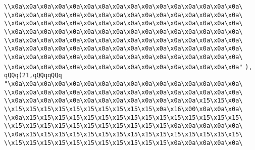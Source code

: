 \verb|\\x0a\x0a\x0a\x0a\x0a\x0a\x0a\x0a\x0a\x0a\x0a\x0a\x0a\x0a\x0a\x0a\|\newline
\verb|\\x0a\x0a\x0a\x0a\x0a\x0a\x0a\x0a\x0a\x0a\x0a\x0a\x0a\x0a\x0a\x0a\|\newline
\verb|\\x0a\x0a\x0a\x0a\x0a\x0a\x0a\x0a\x0a\x0a\x0a\x0a\x0a\x0a\x0a\x0a\|\newline
\verb|\\x0a\x0a\x0a\x0a\x0a\x0a\x0a\x0a\x0a\x0a\x0a\x0a\x0a\x0a\x0a\x0a\|\newline
\verb|\\x0a\x0a\x0a\x0a\x0a\x0a\x0a\x0a\x0a\x0a\x0a\x0a\x0a\x0a\x0a\x0a\|\newline
\verb|\\x0a\x0a\x0a\x0a\x0a\x0a\x0a\x0a\x0a\x0a\x0a\x0a\x0a\x0a\x0a\x0a\|\newline
\verb|\\x0a\x0a\x0a\x0a\x0a\x0a\x0a\x0a\x0a\x0a\x0a\x0a\x0a\x0a\x0a\x0a\|\newline
\verb|\\x0a\x0a\x0a\x0a\x0a\x0a\x0a\x0a\x0a\x0a\x0a\x0a\x0a\x0a\x0a\x0a"|\newline
\verb|),|\newline
\verb|qQQq(21,qQQqqQQq|\newline
\verb|"\x0a\x0a\x0a\x0a\x0a\x0a\x0a\x0a\x0a\x0a\x0a\x0a\x0a\x0a\x0a\x0a\|\newline
\verb|\\x0a\x0a\x0a\x0a\x0a\x0a\x0a\x0a\x0a\x0a\x0a\x0a\x0a\x0a\x0a\x0a\|\newline
\verb|\\x0a\x0a\x0a\x0a\x0a\x0a\x0a\x0a\x0a\x0a\x0a\x0a\x0a\x15\x15\x0a\|\newline
\verb|\\x15\x15\x15\x15\x15\x15\x15\x15\x15\x15\x0a\x16\x00\x0a\x0a\x0a\|\newline
\verb|\\x0a\x15\x15\x15\x15\x15\x15\x15\x15\x15\x15\x15\x15\x15\x15\x15\|\newline
\verb|\\x15\x15\x15\x15\x15\x15\x15\x15\x15\x15\x15\x0a\x0a\x0a\x0a\x0a\|\newline
\verb|\\x0a\x15\x15\x15\x15\x15\x15\x15\x15\x15\x15\x15\x15\x15\x15\x15\|\newline
\verb|\\x15\x15\x15\x15\x15\x15\x15\x15\x15\x15\x15\x0a\x0a\x0a\x0a\x0a\|\newline
